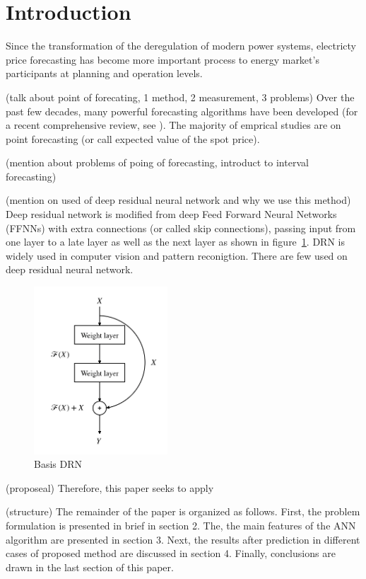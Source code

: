 \documentclass[review]{elsarticle}
\begin{document}
\linenumbers

\section{Introduction}

  Since the transformation of the deregulation of modern power systems, electricty price forecasting has become more important process to energy market's participants at planning and operation levels.

  (talk about point of forecating, 1 method, 2 measurement, 3 problems) Over the past few decades, many powerful forecasting algorithms have been developed (for a recent comprehensive review, see \cite{Weron2014}). The majority of emprical studies are on point forecasting (or call expected value of the spot price).

  (mention about problems of poing of forecasting, introduct to interval forecasting)

  (mention on used of deep residual neural network and why we use this method)
  Deep residual network is modified from deep Feed Forward Neural Networks (FFNNs) with extra connections (or called skip connections), passing input from one layer to a late layer as well as the next layer as shown in figure~\ref{Fig:Basic_DRN}. DRN is widely used in computer vision and pattern reconigtion. There are few used on deep residual neural network.

  \begin{figure}[H]
    \caption{Basis DRN}
    \label{Fig:Basic_DRN}
    \includegraphics[width=5cm]{basic_DRN}
  \centering
  \end{figure}


  (proposeal) Therefore, this paper seeks to apply

  (structure) The remainder of the paper is organized as follows. First, the problem formulation is presented in brief in section 2. The, the main features of the ANN algorithm are presented in section 3. Next, the results after prediction in different cases of proposed method  are discussed in section 4. Finally, conclusions are drawn in the last section of this paper.
\end{document}
